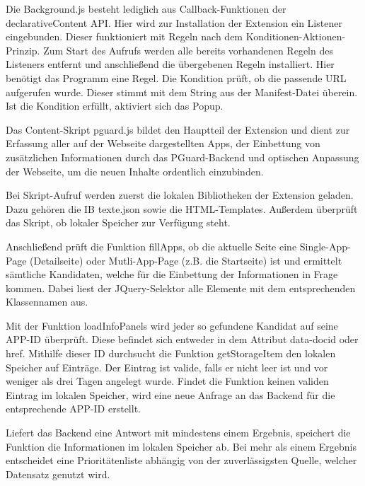 Die Background.js besteht lediglich aus Callback-Funktionen der declarativeContent API. Hier wird zur Installation der Extension ein Listener eingebunden. Dieser funktioniert mit Regeln nach dem Konditionen-Aktionen-Prinzip. Zum Start des Aufrufs werden alle bereits vorhandenen Regeln des Listeners entfernt und anschließend die übergebenen Regeln installiert.
Hier benötigt das Programm eine Regel. Die Kondition prüft, ob die passende URL aufgerufen wurde. Dieser stimmt mit dem String aus der Manifest-Datei überein. Ist die Kondition erfüllt, aktiviert sich das Popup.




Das Content-Skript \glqq pguard.js \grqq{} bildet den Hauptteil der Extension und dient zur Erfassung aller auf der Webseite dargestellten Apps, der Einbettung von zusätzlichen Informationen durch das PGuard-Backend und optischen Anpassung der Webseite, um die neuen Inhalte ordentlich einzubinden.

Bei Skript-Aufruf werden zuerst die lokalen Bibliotheken der Extension geladen. Dazu gehören die IB texte.json sowie die HTML-Templates. Außerdem überprüft das Skript, ob lokaler Speicher zur Verfügung steht.

Anschließend prüft die Funktion \glqq fillApps\grqq{}, ob die aktuelle Seite eine Single-App-Page (Detailseite) oder Mutli-App-Page (z.B. die Startseite) ist und ermittelt sämtliche Kandidaten, welche für die Einbettung der Informationen in Frage kommen. Dabei liest der JQuery-Selektor alle Elemente mit dem entsprechenden Klassennamen aus.

Mit der Funktion \glqq loadInfoPanels\grqq{} wird jeder so gefundene Kandidat auf seine APP-ID überprüft. Diese befindet sich entweder in dem Attribut \glqq data-docid\grqq{} oder \glqq href\grqq{}. Mithilfe dieser ID durchsucht die Funktion \glqq getStorageItem\grqq{} den lokalen Speicher auf Einträge. Der  Eintrag ist valide, falls er nicht leer ist und vor weniger als drei Tagen angelegt wurde. Findet die Funktion keinen validen Eintrag im lokalen Speicher, wird eine neue Anfrage an das Backend für die entsprechende APP-ID erstellt.

Liefert das Backend eine Antwort mit mindestens einem Ergebnis, speichert die Funktion die Informationen im lokalen Speicher ab. Bei mehr als einem Ergebnis entscheidet eine Prioritätenliste abhängig von der zuverlässigsten Quelle, welcher Datensatz genutzt wird.


